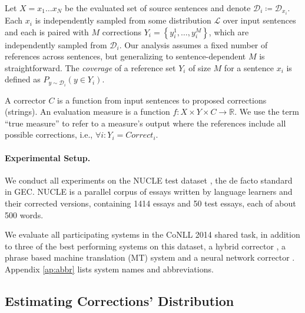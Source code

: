 \documentclass[a4paper, 11pt]{article}
\begin{document}
Let $X=x_{1}\ldots x_{N}$ be the evaluated set of source sentences and denote $\mathcal{D}_{i}\coloneqq \mathcal{D}_{x_i}$. Each $x_{i}$ is independently sampled from some 
distribution $\mathcal{L}$ over input sentences 
and each is paired with $M$ corrections $Y_i = \left\{y_{i}^{1},\ldots, y_{i}^{M}\right\}$,
which are independently sampled from $\mathcal{D}_{i}$. Our analysis assumes a fixed number of references across sentences, 
but generalizing to sentence-dependent $M$ is straightforward.
The {\it coverage} of a reference set $Y_i$ of size $M$ for a sentence $x_i$ is defined as $P_{y \sim \mathcal{D}_i}(y \in Y_i)$.

A corrector $C$ is a function from input sentences to proposed corrections (strings).
An evaluation measure is a function $f\colon X \times Y \times C\to \mathbb{R}$. We use the term ``true measure'' to refer to a measure's output where the references include all possible corrections, 
i.e., $\forall i\colon Y_i=Correct_i$.

\vspace{-.2cm}
\paragraph{Experimental Setup.}\label{par:experimental_setup}
We conduct all experiments on the NUCLE test dataset \cite{dahlmeier2013building},
the de facto standard in GEC.
NUCLE is a parallel corpus of essays written by language learners and their corrected versions,
containing 1414 essays and 50 test essays, each of about 500 words.

We evaluate all participating systems in the CoNLL 2014 shared task,
in addition to three of the best performing systems on this dataset,
a hybrid corrector \cite{rozovskaya2016grammatical},
a phrase based machine translation (MT) system \cite{junczysdowmunt-grundkiewicz:2016:EMNLP2016} 
and a neural network corrector \cite{xie2016neural}.
Appendix  \ref{ap:abbr} lists system names and abbreviations.

%
	\vspace{-0.1cm}
\subsection{Estimating Corrections' Distribution}\label{subsec:corrections_distribution}
	\vspace{-0.1cm}
%
\end{document}
